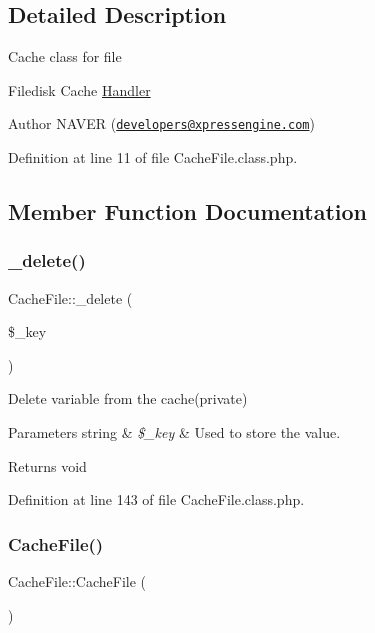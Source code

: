 \subsection{Detailed Description}
Cache class for file

Filedisk Cache \hyperlink{classHandler}{Handler}

\begin{DoxyAuthor}{Author}
N\+A\+V\+ER (\href{mailto:developers@xpressengine.com}{\tt developers@xpressengine.\+com}) 
\end{DoxyAuthor}


Definition at line 11 of file Cache\+File.\+class.\+php.



\subsection{Member Function Documentation}
\hypertarget{classCacheFile_a59058fb815de83e25ec107fec5dff2d2}{}\label{classCacheFile_a59058fb815de83e25ec107fec5dff2d2} 
\subsubsection{\texorpdfstring{\+\_\+delete()}{\_delete()}}
{\footnotesize\ttfamily Cache\+File\+::\+\_\+delete (\begin{DoxyParamCaption}\item[{}]{\$\+\_\+key }\end{DoxyParamCaption})}

Delete variable from the cache(private)


\begin{DoxyParams}[1]{Parameters}
string & {\em \$\+\_\+key} & Used to store the value. \\
\hline
\end{DoxyParams}
\begin{DoxyReturn}{Returns}
void 
\end{DoxyReturn}


Definition at line 143 of file Cache\+File.\+class.\+php.

\hypertarget{classCacheFile_a989f8b586fb83812f1c0ab1e3f2e302a}{}\label{classCacheFile_a989f8b586fb83812f1c0ab1e3f2e302a} 
\subsubsection{\texorpdfstring{Cache\+File()}{CacheFile()}}
{\footnotesize\ttfamily Cache\+File\+::\+Cache\+File (\begin{DoxyParamCaption}{ }\end{DoxyParamCaption})}

